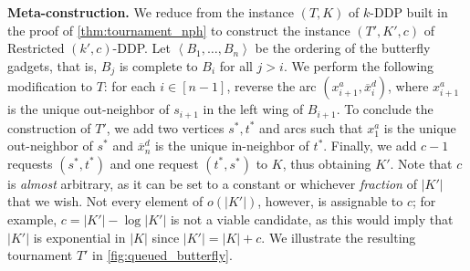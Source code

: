 \documentclass[a4paper,UKenglish,cleveref, autoref, thm-restate]{lipics-v2021}
\newcommand{\angled}[1]{\left\langle{#1}\right\rangle}
\newcommand{\pname}[1]{{\sc #1}}
\newcommand{\ol}[1]{\overline{#1}}
\newcommand{\congestion}{c}
\begin{document}
  \noindent\textbf{Meta-construction.} We reduce from the instance $(T, K)$ of \pname{$k$-DDP} built in the proof of \autoref{thm:tournament_nph} to construct the
  instance $(T', K', \congestion)$ of \pname{Restricted $(k',c)$-DDP}. Let
  $\angled{B_1, \dots, B_n}$ be the ordering of the butterfly gadgets, that is, $B_j$ is
  complete to $B_i$ for all $j > i$.
  We perform the following modification to $T$: for each $i \in [n-1]$, reverse the arc
  $(x^a_{i+1}, \ol{x}^d_i)$, where $x^a_{i+1}$ is the unique out-neighbor of $s_{i+1}$ in
  the left wing of $B_{i+1}$.
  To conclude the construction of $T'$, we add two vertices $s^*, t^*$ and arcs such that
  $x^a_1$ is the unique out-neighbor of $s^*$ and $\ol{x}^d_n$ is the unique in-neighbor of $t^*$.
  Finally, we add $\congestion-1$ requests $(s^*, t^*)$ and one request $(t^*, s^*)$ to
  $K$, thus obtaining $K'$.
  Note that $\congestion$ is \textit{almost} arbitrary, as it can be set to a constant or whichever
  \textit{fraction} of $|K'|$ that we wish.
  Not every element of $o(|K'|)$, however, is assignable to $\congestion$; for example,
  $\congestion = |K'| -
  \log |K'|$ is not a viable candidate, as this would imply that $|K'|$ is exponential in
  $|K|$ since $|K'| = |K| + \congestion$.
  We illustrate the resulting tournament $T'$ in \autoref{fig:queued_butterfly}.
\end{document}
